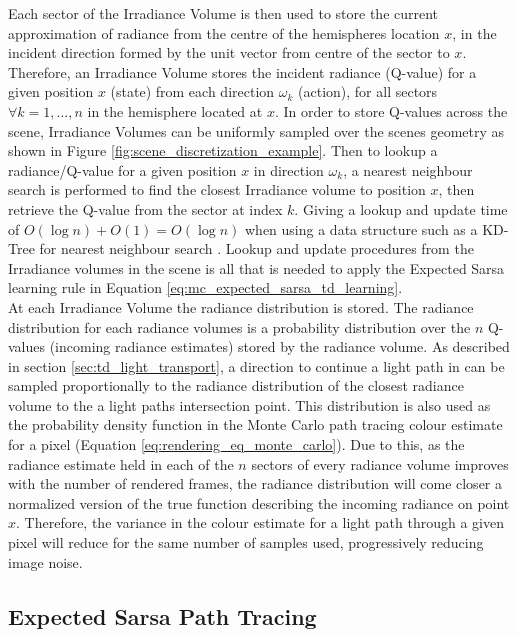 \documentclass[../dissertation.tex]{subfiles}
\begin{document}
Each sector of the Irradiance Volume is then used to store the current approximation of radiance from the centre of the hemispheres location $x$, in the incident direction formed by the unit vector from centre of the sector to $x$. Therefore, an Irradiance Volume stores the incident radiance (Q-value) for a given position $x$ (state) from each direction $\omega_k$ (action), for all sectors $\forall k = 1,...,n$ in the hemisphere located at $x$. In order to store Q-values across the scene, Irradiance Volumes can be uniformly sampled over the scenes geometry as shown in Figure \ref{fig:scene_discretization_example}. Then to lookup a radiance/Q-value for a given position $x$ in direction $\omega_k$, a nearest neighbour search is performed to find the closest Irradiance volume to position $x$, then retrieve the Q-value from the sector at index $k$. Giving a lookup and update time of $O(\log n) + O(1) = O(\log n)$ when using a data structure such as a KD-Tree for nearest neighbour search \cite{bentley1975multidimensional}. Lookup and update procedures from the Irradiance volumes in the scene is all that is needed to apply the Expected Sarsa learning rule in Equation \ref{eq:mc_expected_sarsa_td_learning}.\\

At each Irradiance Volume the radiance distribution is stored. The radiance distribution for each radiance volumes is a probability distribution over the $n$ Q-values (incoming radiance estimates) stored by the radiance volume. As described in section \ref{sec:td_light_transport}, a direction to continue a light path in can be sampled proportionally to the radiance distribution of the closest radiance volume to the a light paths intersection point. This distribution is also used as the probability density function in the Monte Carlo path tracing colour estimate for a pixel (Equation \ref{eq:rendering_eq_monte_carlo}). Due to this, as the radiance estimate held in each of the $n$ sectors of every radiance volume improves with the number of rendered frames, the radiance distribution will come closer a normalized version of the true function describing the incoming radiance on point $x$. Therefore, the variance in the colour estimate for a light path through a given pixel will reduce for the same number of samples used, progressively reducing image noise.

\subsection{Expected Sarsa Path Tracing}
\end{document}
